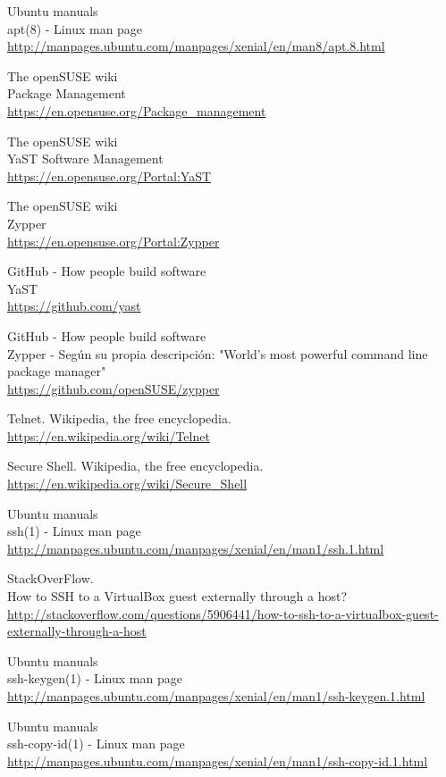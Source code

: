 \begin{thebibliography}{10}
Ubuntu manuals\\
apt(8) - Linux man page\\
  \url{http://manpages.ubuntu.com/manpages/xenial/en/man8/apt.8.html}

The openSUSE wiki\\
Package Management\\
  \url{https://en.opensuse.org/Package_management}

The openSUSE wiki\\
YaST Software Management\\
  \url{https://en.opensuse.org/Portal:YaST}

The openSUSE wiki\\
Zypper\\
  \url{https://en.opensuse.org/Portal:Zypper}

GitHub - How people build software\\
YaST\\
  \url{https://github.com/yast}

GitHub - How people build software\\
Zypper - Según su propia descripción: "World's most powerful command line package manager"\\
  \url{https://github.com/openSUSE/zypper}

Telnet. Wikipedia, the free encyclopedia.\\
  \url{https://en.wikipedia.org/wiki/Telnet}

Secure Shell. Wikipedia, the free encyclopedia.\\
  \url{https://en.wikipedia.org/wiki/Secure_Shell}

Ubuntu manuals\\
ssh(1) - Linux man page\\
  \url{http://manpages.ubuntu.com/manpages/xenial/en/man1/ssh.1.html}

StackOverFlow. \\
How to SSH to a VirtualBox guest externally through a host? \\
  \url{http://stackoverflow.com/questions/5906441/how-to-ssh-to-a-virtualbox-guest-externally-through-a-host}

Ubuntu manuals\\
ssh-keygen(1) - Linux man page\\
  \url{http://manpages.ubuntu.com/manpages/xenial/en/man1/ssh-keygen.1.html}

Ubuntu manuals\\
ssh-copy-id(1) - Linux man page\\
  \url{http://manpages.ubuntu.com/manpages/xenial/en/man1/ssh-copy-id.1.html}

\end{thebibliography}
